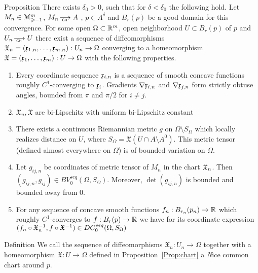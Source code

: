 \documentclass[a4paper,10pt]{article}
\begin{document}
\begin{thm}{ Proposition}\label{Prop:chart}
	There exists $\delta_0>0$, such that for $\delta<\delta_0$
	the following hold.	
	Let   
	$M_n\in\mathcal M_{\geqslant -1}^m$,
	$M_n\GHto A$ , $ p\in A^\delta$
	and $B_r (p)$
	be a good domain for this convergence.
	For some open
	$\Omega\subset \mathbb{R}^m$, open 
	neighborhood $U\subset B_r (p)$ of $p$
	and $U_n\GHto U$ 
	there exist a
	sequence of
	diffeomorphisms $\mathfrak X_n=(\mathfrak x_{1,n},\dots,\mathfrak x_{m,n}):U_n\to\Omega$
	converging to a homeomorphism 	$\mathfrak X=(\mathfrak x_{1},\dots,\mathfrak x_{m}):U\to\Omega$ with 
	the following properties.
	
	\begin{enumerate}[label=\alph*. ]
	
	\item\label{obtuse}

 Every coordinate sequence $\mathfrak x_{i,n}$ is a sequence of smooth concave functions roughly $C^1$-converging to $\mathfrak x_i$. Gradients
	$\nabla\mathfrak x_{i,n}$ and $\nabla\mathfrak x_{j,n}$ form strictly obtuse angles,
	bounded from $\pi$ and $\pi/2$ for
	$i\neq j$. 
	\item $\mathfrak X_n, \mathfrak X$ are bi-Lipschitz 
	with uniform  bi-Lipschitz 
	constant
	
\item\label{metric} 
	There exists a continuous Riemannian metric
	$g$ on $\Omega\setminus S_\Omega$ which locally 
	realizes distance on $U$, where
	$S_\Omega=\mathfrak X(U\cap A\setminus A^0)$.
	This metric tensor 
	(defined almost everywhere on $\Omega$)
	is of bounded variation
	on $\Omega$. 
	
\item\label{metricseq}
	Let $g_{ij,n}$ be coordinates of metric tensor of $M_n$ 
	in the chart $\mathfrak X_n$. 
	Then
	$(g_{ij,n}, g_{ij})\in BV_0^{seq}(\Omega, S_\Omega)$.
	Moreover, $\det(g_{ij,n})$ is bounded and bounded away from 0.
	
	
	\item\label{funktioninchart}
	For any
	sequence
	of concave smooth functions
	$f_n:B_{r_n}(p_n)\to\mathbb{R}$ 
	which roughly $C^1$-converges to  $f:B_r(p )\to\mathbb{R}$ we have for its coordinate
	expression
	$(f_n\circ\mathfrak X_n^{-1}, f\circ\mathfrak X^{-1})\in DC_0^{seq}(\Omega, S_\Omega)$
	
	\end{enumerate}
\end{thm}

\begin{thm}{Definition}
	We call the sequence of
	diffeomorphisms $\mathfrak X_n:U_n\to\Omega$
	together with a homeomorphism 	$\mathfrak X:U\to\Omega$
	defined in
Proposition~\ref{Prop:chart}
a {\emph Nice common chart} around $p$.

\end{thm}
\end{document}

